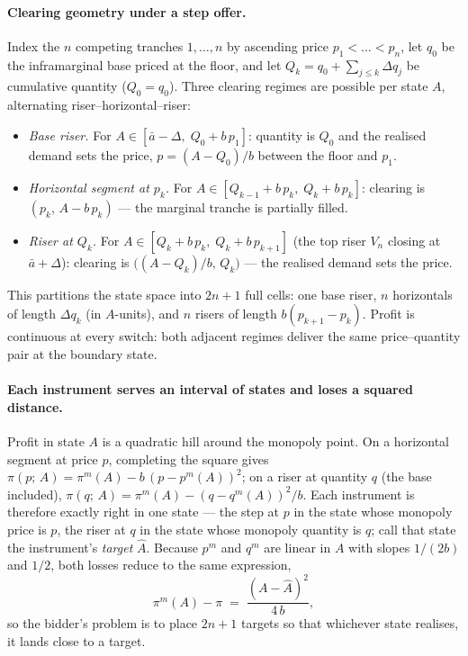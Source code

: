 \documentclass[11pt,a4paper]{article}
\theoremstyle{definition}
\theoremstyle{remark}
\theoremstyle{plain}
\begin{document}
\paragraph{Clearing geometry under a step offer.} Index the $n$ competing tranches $1, \dots, n$ by ascending price $p_1 < \dots < p_n$, let $q_0$ be the inframarginal base priced at the floor, and let $Q_k = q_0 + \sum_{j\le k}\Delta q_j$ be cumulative quantity ($Q_0 = q_0$). Three clearing regimes are possible per state $A$, alternating riser--horizontal--riser:
\begin{itemize}\setlength{\itemsep}{1pt}
\item[$(V_0)$] \emph{Base riser.} For $A \in [\bar a - \Delta,\; Q_0 + b\,p_1]$: quantity is $Q_0$ and the realised demand sets the price, $p = (A - Q_0)/b$ between the floor and $p_1$.
\item[$(H_k)$] \emph{Horizontal segment at $p_k$.} For $A \in [Q_{k-1} + b\,p_k,\; Q_k + b\,p_k]$: clearing is $(p_k,\, A - b\,p_k)$ --- the marginal tranche is partially filled.
\item[$(V_k)$] \emph{Riser at $Q_k$.} For $A \in [Q_k + b\,p_k,\; Q_k + b\,p_{k+1}]$ (the top riser $V_n$ closing at $\bar a + \Delta$): clearing is $\bigl((A - Q_k)/b,\, Q_k\bigr)$ --- the realised demand sets the price.
\end{itemize}
This partitions the state space into $2n+1$ full cells: one base riser, $n$ horizontals of length $\Delta q_k$ (in $A$-units), and $n$ risers of length $b(p_{k+1} - p_k)$. Profit is continuous at every switch: both adjacent regimes deliver the same price--quantity pair at the boundary state.

\paragraph{Each instrument serves an interval of states and loses a squared distance.} Profit in state $A$ is a quadratic hill around the monopoly point. On a horizontal segment at price $p$, completing the square gives $\pi(p;\, A) = \pi^m(A) - b\,(p - p^m(A))^2$; on a riser at quantity $q$ (the base included), $\pi(q;\, A) = \pi^m(A) - (q - q^m(A))^2/b$. Each instrument is therefore exactly right in one state --- the step at $p$ in the state whose monopoly price is $p$, the riser at $q$ in the state whose monopoly quantity is $q$; call that state the instrument's \emph{target} $\hat A$. Because $p^m$ and $q^m$ are linear in $A$ with slopes $1/(2b)$ and $1/2$, both losses reduce to the same expression,
\[
\pi^m(A) - \pi \;=\; \frac{(A - \hat A)^2}{4\,b},
\]
so the bidder's problem is to place $2n+1$ targets so that whichever state realises, it lands close to a target.
\end{document}
